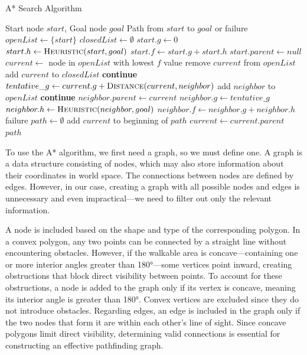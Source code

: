 \begin{algorithm}
\caption{A* Search Algorithm}\label{alg:AStar}
\begin{algorithmic}[1]
\Require Start node $start$, Goal node $goal$
\Ensure Path from $start$ to $goal$ or failure
\Statex
{}
    \State $openList \gets \{start\}$
    \State $closedList \gets \emptyset$
    \State $start.g \gets 0$
    \State $start.h \gets \Call{Heuristic}{start, goal}$
    \State $start.f \gets start.g + start.h$
    \State $start.parent \gets null$
        \State $current \gets$ node in $openList$ with lowest $f$ value
            \State \Return {}
        \EndIf
        \State remove $current$ from $openList$
        \State add $current$ to $closedList$
                \State \textbf{continue}
            \EndIf
            \State $tentative\_g \gets current.g + \Call{Distance}{current, neighbor}$
                \State add $neighbor$ to $openList$
                \State \textbf{continue}
            \EndIf
            \State $neighbor.parent \gets current$
            \State $neighbor.g \gets tentative\_g$
            \State $neighbor.h \gets \Call{Heuristic}{neighbor, goal}$
            \State $neighbor.f \gets neighbor.g + neighbor.h$
        \EndFor
    \EndWhile
    \State \Return failure
\EndFunction
\Statex
{}
    \State $path \gets \emptyset$
        \State add $current$ to beginning of $path$
        \State $current \gets current.parent$
    \EndWhile
    \State \Return $path$
\EndFunction
\end{algorithmic}
\end{algorithm}

To use the A* algorithm, we first need a graph, so we must define one. A graph is a data structure consisting of nodes, which may also store information about their coordinates in world space. The connections between nodes are defined by edges. However, in our case, creating a graph with all possible nodes and edges is unnecessary and even impractical—we need to filter out only the relevant information.

A node is included based on the shape and type of the corresponding polygon. In a convex polygon, any two points can be connected by a straight line without encountering obstacles. However, if the walkable area is concave—containing one or more interior angles greater than 180°—some vertices point inward, creating obstructions that block direct visibility between points. To account for these obstructions, a node is added to the graph only if its vertex is concave, meaning its interior angle is greater than 180°. Convex vertices are excluded since they do not introduce obstacles. Regarding edges, an edge is included in the graph only if the two nodes that form it are within each other’s line of sight. Since concave polygons limit direct visibility, determining valid connections is essential for constructing an effective pathfinding graph.

